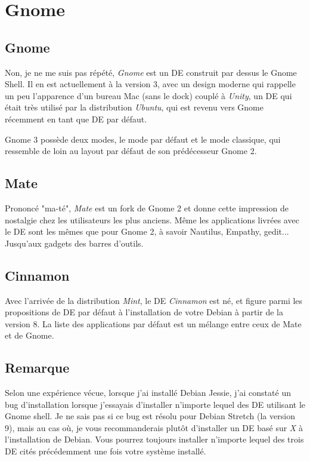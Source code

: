 \chapter{Gnome}

\section{Gnome}

Non, je ne me suis pas répété, \emph{Gnome} est un DE construit par dessus le
Gnome Shell. Il en est actuellement à la version 3, avec un design moderne qui
rappelle un peu l'apparence d'un bureau Mac (sans le dock) couplé à \emph{Unity},
un DE qui était très utilisé par la distribution \emph{Ubuntu}, qui est revenu
vers Gnome récemment en tant que DE par défaut.

Gnome 3 possède deux modes, le mode par défaut et le mode classique, qui
ressemble de loin au layout par défaut de son prédécesseur Gnome 2.

\section{Mate}

Prononcé "ma-té", \emph{Mate} est un fork de Gnome 2 et donne cette impression de nostalgie
chez les utilisateurs les plus anciens. Même les applications livrées avec le DE
sont les mêmes que pour Gnome 2, à savoir Nautilus, Empathy, gedit... Jusqu'aux
gadgets des barres d'outils.

\section{Cinnamon}

Avec l'arrivée de la distribution \emph{Mint}, le DE \emph{Cinnamon} est né, et
figure parmi les propositions de DE par défaut à l'installation de votre Debian
à partir de la version 8. La liste des applications par défaut est un mélange
entre ceux de Mate et de Gnome.

\section{Remarque}

Selon une expérience vécue, lorsque j'ai installé Debian Jessie, j'ai constaté
un bug d'installation lorsque j'essayais d'installer n'importe lequel des DE
utilisant le Gnome shell. Je ne sais pas si ce bug est résolu pour Debian Stretch
(la version 9), mais au cas où, je vous recommanderais plutôt d'installer un DE
basé sur \emph{X} à l'installation de Debian. Vous pourrez toujours installer
n'importe lequel des trois DE cités précédemment une fois votre système installé.

